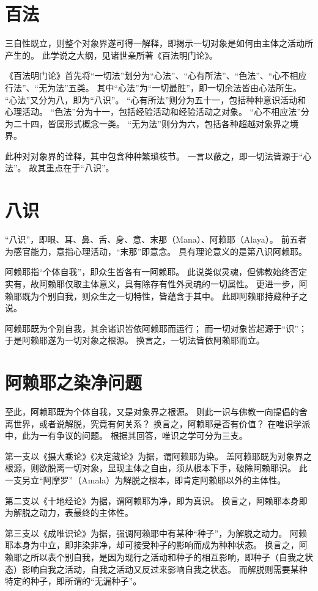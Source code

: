 \documentclass[11pt]{article}
\begin{document}
\section{百法}
三自性既立，则整个对象界遂可得一解释，即揭示一切对象是如何由主体之活动所产生的。
此学说之大纲，见诸世亲所著《百法明门论》。

\newline

《百法明门论》首先将“一切法”划分为“心法”、“心有所法”、“色法”、“心不相应行法”、“无为法”五类。
其中“心法”为“一切最胜”，即一切余法皆由心法所生。
“心法”又分为八，即为“八识”。
“心有所法”则分为五十一，包括种种意识活动和心理活动。
“色法”分为十一，包括经验活动和经验活动之对象。
“心不相应法”分为二十四，皆属形式概念一类。
“无为法”则分为六，包括各种超越对象界之境界。

\newline

此种对对象界的诠释，其中包含种种繁琐枝节。
一言以蔽之，即一切法皆源于“心法”。
故其重点在于“八识”。

\section{八识}
“八识”，即眼、耳、鼻、舌、身、意、末那（Mana）、阿赖耶（Alaya）。
前五者为感官能力，意指心理活动，“末那”即意念。
具有理论意义的是第八识阿赖耶。

\newline

阿赖耶指“个体自我”，即众生皆各有一阿赖耶。
此说类似灵魂，但佛教始终否定实有，故阿赖耶仅取主体意义，具有除存有性外灵魂的一切属性。
更进一步，阿赖耶既为个别自我，则众生之一切特性，皆蕴含于其中。
此即阿赖耶持藏种子之说。

\newline

阿赖耶既为个别自我，其余诸识皆依阿赖耶而运行；
而一切对象皆起源于“识”；
于是阿赖耶遂为一切对象之根源。
换言之，一切法皆依阿赖耶而立。

\section{阿赖耶之染净问题}
至此，阿赖耶既为个体自我，又是对象界之根源。
则此一识与佛教一向提倡的舍离世界，或者说解脱，究竟有何关系？
换言之，阿赖耶是否有价值？
在唯识学派中，此为一有争议的问题。
根据其回答，唯识之学可分为三支。

\newline

第一支以《摄大乘论》《决定藏论》为据，谓阿赖耶为染。
盖阿赖耶既为对象界之根源，则欲脱离一切对象，显现主体之自由，须从根本下手，破除阿赖耶识。
此一支另立“阿摩罗”（Amala）为解脱之根本，即肯定阿赖耶以外的主体性。

\newline

第二支以《十地经论》为据，谓阿赖耶为净，即为真识。
换言之，阿赖耶本身即为解脱之动力，表最终的主体性。

\newline

第三支以《成唯识论》为据，强调阿赖耶中有某种“种子”，为解脱之动力。
阿赖耶本身为中立，即非染非净，却可接受种子的影响而成为种种状态。
换言之，阿赖耶之所以表个别自我，是因为现行之活动和种子的相互影响，即种子（自我之状态）影响自我之活动，自我之活动又反过来影响自我之状态。
而解脱则需要某种特定的种子，即所谓的“无漏种子”。  
  
\end{document}
